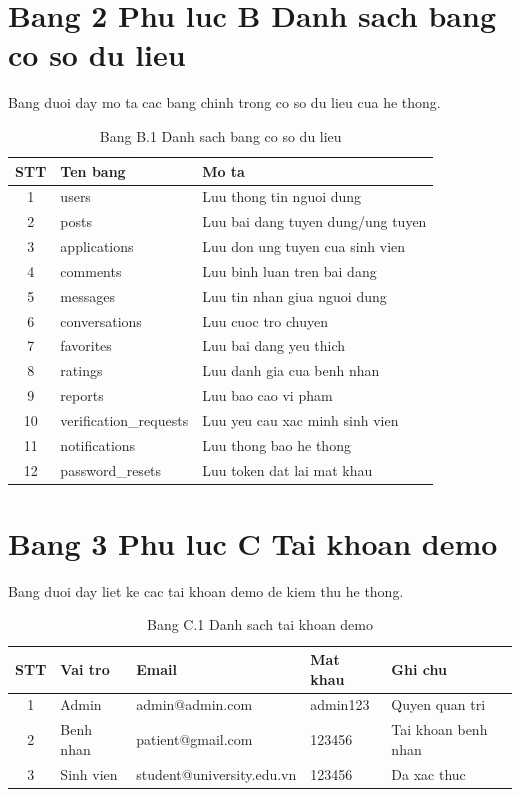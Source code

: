 \section*{Bang 2 Phu luc B Danh sach bang co so du lieu}

Bang duoi day mo ta cac bang chinh trong co so du lieu cua he thong.

\begin{table}[H]
\centering
\begin{tabular}{|c|p{3.5cm}|p{6.5cm}|}
\hline
STT & Ten bang & Mo ta \\
\hline
1 & users & Luu thong tin nguoi dung \\
\hline
2 & posts & Luu bai dang tuyen dung/ung tuyen \\
\hline
3 & applications & Luu don ung tuyen cua sinh vien \\
\hline
4 & comments & Luu binh luan tren bai dang \\
\hline
5 & messages & Luu tin nhan giua nguoi dung \\
\hline
6 & conversations & Luu cuoc tro chuyen \\
\hline
7 & favorites & Luu bai dang yeu thich \\
\hline
8 & ratings & Luu danh gia cua benh nhan \\
\hline
9 & reports & Luu bao cao vi pham \\
\hline
10 & verification\_requests & Luu yeu cau xac minh sinh vien \\
\hline
11 & notifications & Luu thong bao he thong \\
\hline
12 & password\_resets & Luu token dat lai mat khau \\
\hline
\end{tabular}
\caption*{Bang B.1 Danh sach bang co so du lieu}
\end{table}

\section*{Bang 3 Phu luc C Tai khoan demo}

Bang duoi day liet ke cac tai khoan demo de kiem thu he thong.

\begin{table}[H]
\centering
\begin{tabular}{|c|l|l|l|l|}
\hline
STT & Vai tro & Email & Mat khau & Ghi chu \\
\hline
1 & Admin & admin@admin.com & admin123 & Quyen quan tri \\
\hline
2 & Benh nhan & patient@gmail.com & 123456 & Tai khoan benh nhan \\
\hline
3 & Sinh vien & student@university.edu.vn & 123456 & Da xac thuc \\
\hline
\end{tabular}
\caption*{Bang C.1 Danh sach tai khoan demo}
\end{table}


